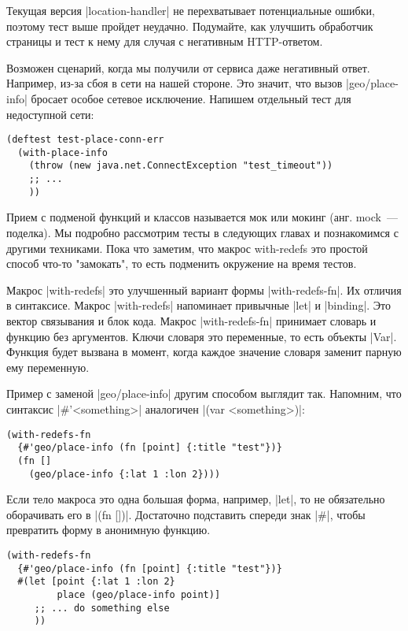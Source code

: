 Текущая версия \spverb|location-handler| не перехватывает потенциальные ошибки,
поэтому тест выше пройдет неудачно. Подумайте, как улучшить обработчик страницы
и тест к нему для случая с негативным HTTP-ответом.

Возможен сценарий, когда мы получили от сервиса даже негативный ответ. Например,
из-за сбоя в сети на нашей стороне. Это значит, что вызов \spverb|geo/place-info|
бросает особое сетевое исключение. Напишем отдельный тест для недоступной сети:

\begin{verbatim}
(deftest test-place-conn-err
  (with-place-info
    (throw (new java.net.ConnectException "test_timeout"))
    ;; ...
    ))
\end{verbatim}

Прием с подменой функций и классов называется мок или мокинг (анг. mock~---
поделка). Мы подробно рассмотрим тесты в следующих главах и познакомимся с
другими техниками. Пока что заметим, что макрос with-redefs это простой способ
что-то "замокать", то есть подменить окружение на время тестов.

Макрос \spverb|with-redefs| это улучшенный вариант формы \spverb|with-redefs-fn|. Их отличия в
синтаксисе. Макрос \spverb|with-redefs| напоминает привычные \spverb|let| и \spverb|binding|. Это
вектор связывания и блок кода. Макрос \spverb|with-redefs-fn| принимает словарь и
функцию без аргументов. Ключи словаря это переменные, то есть объекты
\spverb|Var|. Функция будет вызвана в момент, когда каждое значение словаря заменит
парную ему переменную.

Пример с заменой \spverb|geo/place-info| другим способом выглядит так. Напомним, что
синтаксис \spverb|#'<something>| аналогичен \spverb|(var <something>)|:

\begin{verbatim}
(with-redefs-fn
  {#'geo/place-info (fn [point] {:title "test"})}
  (fn []
    (geo/place-info {:lat 1 :lon 2})))
\end{verbatim}

Если тело макроса это одна большая форма, например, \spverb|let|, то не обязательно
оборачивать его в \spverb|(fn [])|. Достаточно подставить спереди знак \spverb|#|, чтобы
превратить форму в анонимную функцию.

\begin{verbatim}
(with-redefs-fn
  {#'geo/place-info (fn [point] {:title "test"})}
  #(let [point {:lat 1 :lon 2}
         place (geo/place-info point)]
     ;; ... do something else
     ))
\end{verbatim}

